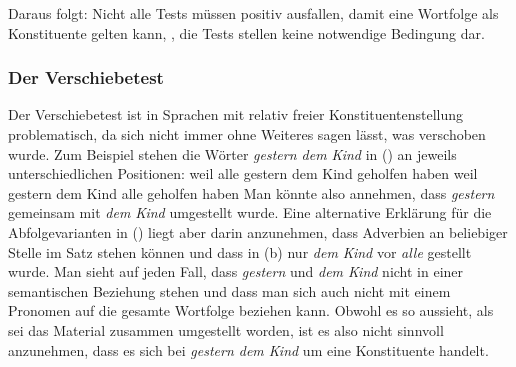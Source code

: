 Daraus folgt: Nicht alle Tests müssen positiv ausfallen, damit eine Wortfolge als Konstituente gelten kann,
\dash, die Tests stellen keine notwendige Bedingung dar.




\subsubsection{Der Verschiebetest}

Der Verschiebetest ist in Sprachen mit relativ freier Konstituentenstellung problematisch, da sich
nicht immer ohne Weiteres sagen lässt, was verschoben wurde. Zum Beispiel stehen die Wörter
\emph{gestern dem Kind} in () an jeweils unterschiedlichen Positionen:
\eal
\ex weil alle gestern dem Kind geholfen haben
\ex weil gestern dem Kind alle geholfen haben
\zl
Man könnte also annehmen, dass \emph{gestern} gemeinsam mit \emph{dem Kind} umgestellt wurde. Eine
alternative Erklärung für die Abfolgevarianten in () liegt aber darin anzunehmen, dass
Adverbien an beliebiger Stelle im Satz stehen können und dass in (b) nur \emph{dem Kind} vor
\emph{alle} gestellt wurde. Man sieht auf jeden Fall, dass \emph{gestern} und \emph{dem Kind} nicht
in einer semantischen Beziehung stehen und dass man sich auch nicht mit einem Pronomen auf die
gesamte Wortfolge beziehen kann. Obwohl es so aussieht, als sei das Material zusammen umgestellt
worden, ist es also nicht sinnvoll anzunehmen, dass es sich bei \emph{gestern dem Kind} um eine
Konstituente handelt.

